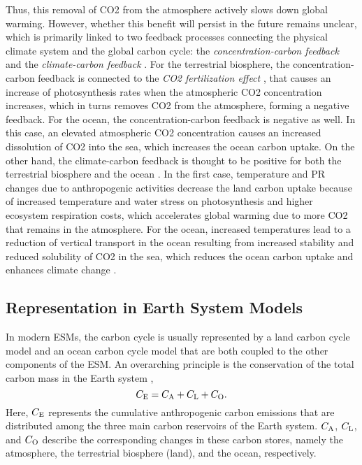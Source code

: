 Thus, this removal of \ac{CO2} from the atmosphere actively slows down global
warming. However, whether this benefit will persist in the future remains
unclear, which is primarily linked to two feedback processes connecting the
physical climate system and the global carbon cycle: the
\emph{concentration-carbon feedback} and the \emph{climate-carbon feedback}
\autocite{Friedlingstein2006, Gregory2009, Collins2013}. For the terrestrial
biosphere, the concentration-carbon feedback is connected to the \emph{\ac{CO2}
  fertilization effect} \autocite{Walker2020}, that causes an increase of
photosynthesis rates when the atmospheric \ac{CO2} concentration increases,
which in turns removes \ac{CO2} from the atmosphere, forming a negative
feedback. For the ocean, the concentration-carbon feedback is negative as well.
In this case, an elevated atmospheric \ac{CO2} concentration causes an
increased dissolution of \ac{CO2} into the sea, which increases the ocean
carbon uptake. On the other hand, the climate-carbon feedback is thought to be
positive for both the terrestrial biosphere and the ocean
\autocite{Gregory2009}. In the first case, temperature and \acl{PR} changes due
to anthropogenic activities decrease the land carbon uptake because of
increased temperature and water stress on photosynthesis and higher ecosystem
respiration costs, which accelerates global warming due to more \ac{CO2} that
remains in the atmosphere. For the ocean, increased temperatures lead to a
reduction of vertical transport in the ocean resulting from increased stability
and reduced solubility of \ac{CO2} in the sea, which reduces the ocean carbon
uptake and enhances climate change \autocite{Gregory2009}.


\subsection{Representation in Earth System Models}
\label{subsec:02:carbon_cycle_representation}

In modern \acp{ESM}, the carbon cycle is usually represented by a land carbon
cycle model and an ocean carbon cycle model that are both coupled to the other
components of the \ac{ESM}. An overarching principle is the conservation of the
total carbon mass in the Earth system \autocite{Gregory2009}, \ie{}
\begin{equation}
  C_{\textnormal{E}}{} = C_{\textnormal{A}}{} + C_{\textnormal{L}}{} + C_{\textnormal{O}}{}.
  \label{eq:02:carbon_balance}
\end{equation}
Here, $C_{\textnormal{E}}{}$ represents the cumulative anthropogenic carbon emissions that are
distributed among the three main carbon reservoirs of the Earth system.
$C_{\textnormal{A}}{}$, $C_{\textnormal{L}}{}$, and $C_{\textnormal{O}}{}$ describe the corresponding changes in these
carbon stores, namely the atmosphere, the terrestrial biosphere (land), and the
ocean, respectively.


